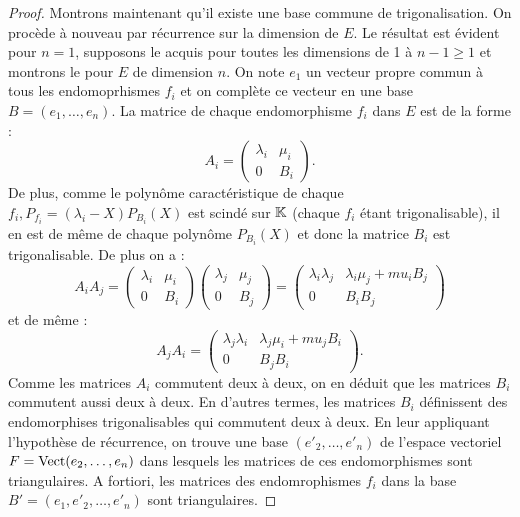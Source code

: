 \begin{proof}
Montrons maintenant qu'il existe une base commune de trigonalisation. On procède à nouveau par récurrence sur la dimension de $E$.
Le résultat est évident pour $n=1$, supposons le acquis pour toutes les dimensions de 1 à $n-1 \geq 1$ et montrons le pour $E$
de dimension $n$.
On note $e_1$ un vecteur propre commun à tous les endomoprhismes $f_i$ et on complète ce vecteur en une base $B=(e_1, \dots, e_n)$.
La matrice de chaque endomorphisme $f_i$ dans $E$ est de la forme :
\[ A_i = \begin{pmatrix} 
\lambda_i & \mu_i \\
0 & B_i
\end{pmatrix} . \]
De plus, comme le polynôme caractéristique de chaque $f_i, P_{f_i} = (\lambda_i-X) P_{B_i}(X)$ est scindé sur $\mathbb{K}$ (chaque $f_i$ étant
trigonalisable), il en est de même de chaque polynôme $P_{B_i}(X)$ et donc la matrice $B_i$ est trigonalisable.
De plus on a :
\[ A_i A_j =  \begin{pmatrix} 
\lambda_i & \mu_i \\
0 & B_i
\end{pmatrix} 
 \begin{pmatrix} 
\lambda_j & \mu_j \\
0 & B_j
\end{pmatrix} 
=
 \begin{pmatrix} 
\lambda_i \lambda_j & \lambda_i \mu_j + mu_i B_j \\
0 & B_i B_j
\end{pmatrix} 
 \]
et de même :
\[ A_j A_i =  \begin{pmatrix} 
\lambda_j \lambda_i & \lambda_j \mu_i + mu_j B_i \\
0 & B_j B_i
\end{pmatrix} .
 \]
Comme les matrices $A_i$ commutent deux à deux, on en déduit que les matrices $B_i$ commutent aussi deux à deux.
En d'autres termes, les matrices $B_i$ définissent des endomorphises trigonalisables qui commutent deux à deux.
En leur appliquant l'hypothèse de récurrence, on trouve une base $(e'_2, \dots, e'_n)$ de l'espace vectoriel $F = \operatorname{Vect}(e_2, \dots, e_n)$
dans lesquels les matrices de ces endomorphismes sont triangulaires. 
A fortiori, les matrices des endomrophismes $f_i$ dans la base $B'=(e_1, e'_2, \dots, e'_n)$ sont triangulaires.
\end{proof}

